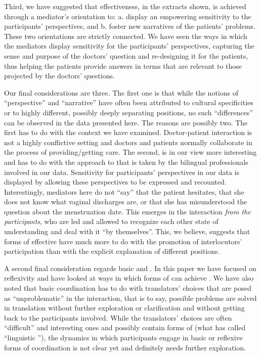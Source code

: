 \documentclass[output=paper]{LSP/langsci}
\begin{document}
Third, we have suggested that effectiveness, in the extracts shown, is achieved through a mediator's orientation to: a. display an empowering sensitivity to the participants' perspectives, and b. foster new narratives of the patients' problems. These two orientations are strictly connected. We have seen the ways in which the mediators display sensitivity for the participants' perspectives, capturing the sense and purpose of the doctors' question and re-designing it for the patients, thus helping the patients provide answers in terms that are relevant to those projected by the doctors' questions.

Our final considerations are three. The first one is that while the notions of ``perspective'' and ``narrative'' have often been attributed to cultural specificities or to highly different, possibly deeply separating positions, no such ``differences'' can be observed in the data presented here. The reasons are possibly two. The first has to do with the context we have examined. Doctor-patient interaction is not a highly conflictive setting and doctors and patients normally collaborate in the process of providing/getting care. The second, is in our view more interesting and has to do with the approach to  that is taken by the bilingual professionals involved in our data. Sensitivity for participants' perspectives in our data is displayed by allowing these perspectives to be expressed and recounted. Interestingly, mediators here do not ``say'' that the patient hesitates, that she does not know what vaginal discharges are, or that she has misunderstood the question about the menstruation date. This emerges in the interaction \textit{from the participants}, who are led and allowed to recognize each other state of understanding and deal with it ``by themselves''. This, we believe, suggests that forms of effective  have much more to do with the promotion of interlocutors' participation than with the explicit explanation of different positions.

\newpage 
A second final consideration regards basic and . In this paper we have focused on reflexivity and have looked at ways in which forms of  can achieve . We have also noted that basic coordination has to do with translators' choices that are posed as ``unproblematic'' in the interaction, that is to say, possible problems are solved in translation without further exploration or clarification and without getting back to the participants involved. While the translators' choices are often ``difficult'' and interesting ones and possibly contain forms of  (what \citealt{Pochhacker2008Interpreting} has called ``linguistic ''), the dynamics in which participants engage in basic or reflexive forms of coordination is not clear yet and definitely needs further exploration.
\end{document}
